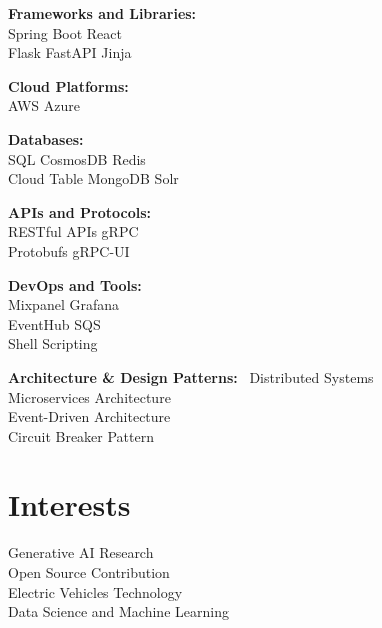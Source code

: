 \documentclass[]{deedy-resume-openfont}
\begin{document}
\begin{minipage}[t]{0.3\textwidth}
\medskip
\noindent \textbf{Frameworks and Libraries:} \\
Spring Boot \textbullet{} React \\
Flask \textbullet{} FastAPI \textbullet{} Jinja

\medskip
\noindent \textbf{Cloud Platforms:} \\
AWS \textbullet{} Azure

\medskip
\noindent \textbf{Databases:} \\
SQL \textbullet{} CosmosDB \textbullet{} Redis \\
Cloud Table \textbullet{} MongoDB \textbullet{} Solr

\medskip
\noindent \textbf{APIs and Protocols:} \\
RESTful APIs \textbullet{} gRPC \textbullet{} \\
Protobufs\textbullet{} gRPC-UI

\medskip
\noindent \textbf{DevOps and Tools:} \\
Mixpanel \textbullet{} Grafana \\
EventHub \textbullet{} SQS \\
Shell Scripting 
\sectionsep

\medskip
\noindent \textbf{Architecture \& Design Patterns:} \
Distributed Systems \\
Microservices Architecture \\
Event-Driven Architecture \\
Circuit Breaker Pattern 
\sectionsep


\section{Interests}
Generative AI Research \\
Open Source Contribution \\
Electric Vehicles Technology \\
Data Science and Machine Learning \\
\sectionsep

%
%

\end{minipage} 
\hfill
\end{document}
